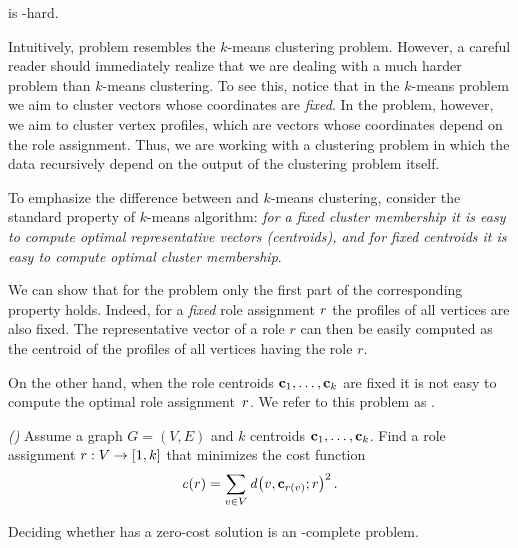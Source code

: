 \begin{proposition}
\label{proposition:np}
\prbrm is \np-hard.
\end{proposition}

Intuitively, problem \prbrm resembles the $k$-means clustering problem.
However, a careful reader should immediately realize
that we are dealing with a much harder problem than $k$-means clustering.
To see this, notice that in the $k$-means problem 
we aim to cluster vectors whose coordinates are \emph{fixed}. 
In the \prbrm problem, however, we aim to cluster vertex profiles,
which are vectors whose coordinates depend on the role assignment.
Thus, we are working with a clustering problem
in which the data recursively depend on the output of the clustering problem itself.

To emphasize the difference between \prbrm and $k$-means clustering, 
consider the standard property of $k$-means algorithm:
\emph{for a fixed cluster membership it is easy to compute optimal representative vectors (centroids), 
and for fixed centroids it is easy to compute optimal cluster membership}. 

We can show that for the \prbrm problem
only the first part of the corresponding property holds.
Indeed, for a \emph{fixed} role assignment $r$
the profiles of all vertices are also fixed.
The representative vector of a role $r$
can then be easily computed as the centroid
of the profiles of all vertices having the role $r$. 

On the other hand, 
when the role centroids $\mathbf{c}_1, \ldots, \mathbf{c}_k$ are fixed
it is not easy to compute the optimal role assignment~$r$.
We refer to this problem as \prbrmfixed.

\begin{problem} 
\label{problem:role-mining-fixed}
\emph{(\prbrmfixed)}
Assume a graph $G = (V, E)$ %
and $k$ centroids $\mathbf{c}_1, \ldots, \mathbf{c}_k$.
Find a role assignment ${r}:{V} \to {[1, k]}$ 
that minimizes the cost function
\[
\cost{\role} = 
\sum_{v \in V} \dist{v, \centroid_{\role(v)}; \role}^2.
\]
\end{problem}


\begin{proposition}
\label{proposition:np-fixed}
Deciding whether \prbrmfixed has a zero-cost solution 
is an \np-complete problem. 
\end{proposition}

